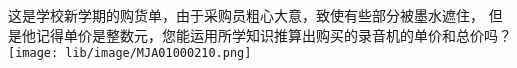 这是学校新学期的购货单，由于采购员粗心大意，致使有些部分被墨水遮住，
但是他记得单价是整数元，您能运用所学知识推算出购买的录音机的单价和总价吗？
\texttt{[image: lib/image/MJA01000210.png]}